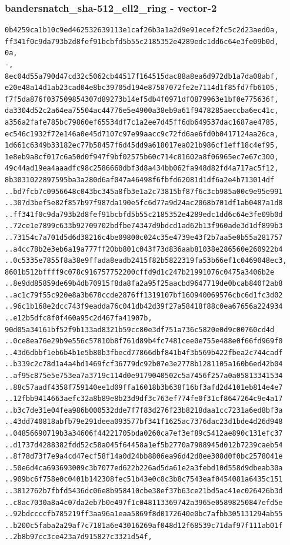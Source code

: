 \documentclass[
]{article}
\begin{document}
\subsubsection{bandersnatch\_sha-512\_ell2\_ring -
vector-2}\label{bandersnatch_sha-512_ell2_ring---vector-2}

\begin{verbatim}
0b4259ca1b10c9ed462532639113e1caf26b3a1a2d9e91ecef2fc5c2d23aed0a,
ff341f0c9da793b2d8fef91bcbfd5b55c2185352e4289edc1dd6c64e3fe09b0d,
0a,
-,
8ec04d55a790d47cd32c5062cb44517f164515dac88a8ea6d972db1a7da08abf,
e20e48a14d1ab23cad04e8bc39705d194e87587072fe2e7114d1f85fd7fb6105,
f7f5da876f037509854307d89273b14ef5db4f0971df0879963e1bf0e775636f,
da3304d52c2a64ea75504ac44776e5e4900a38eb9a61f9478285aeccba6ec41c,
a356a2fafe785bc79860ef65534df7c1a2ee7d45ff6db649537dac1687ae4785,
ec546c1932f72e146a0e45d7107c97e99aacc9c72fd6ae6fd0b0417124aa26ca,
1d661c6349b33182ec77b58457f6d45dd9a618017ea021b986cf1eff18c4ef95,
1e8eb9a8cf017c6a50d0f947f9bf02575b60c714c81602a8f06965ec7e67c300,
49c44ad19ea4aaadfc98c2586660dbf3d8a434bb062fa948d82fd4a717ac5f12,
8b3031022897595ba3a280d6af047a46498f6fbfd62081d1df6a2e4b713014df
..bd7fcb7c0956648c043bc345a8fb3e1a2c73815bf87f6c3cb985a00c9e95e991
..307d3bef5e82f857b97f987da190e5fc6d77a9d24ac2068b701df1ab0487a1d8
..ff341f0c9da793b2d8fef91bcbfd5b55c2185352e4289edc1dd6c64e3fe09b0d
..72ce1e7899c633b92709702bdfbe74347d9bdcd1ad62b13f960ade3d1df899b3
..73154c7a701d5d6d38216c4be09800c024c35e4739e43f2b7aa5e0b55a281757
..a4cc78b2e3eb6a19a777ff20bb801c043f73d836aab81038e286560e260922b4
..0c5335e7855f8a38e9ffada8eadb2415f82b5822319fa53b66ef1c0469048ec3,
8601b512bffff9c078c916757752200cffd9d1c247b21991076c0475a3406b2e
..8e9dd85859de69b4db70915f8da8fa2a95f25aacbd9647719de0bcab840f2ab8
..ac1c79f55c920e8a3b678ccde2876ff1319107bf160940069576cbc6d1fc3d02
..96c1b168e2dcc743f9eadda76c041db42d39f27a58418f88c0ea67656a224934
..e12b5dfc8f0f460a95c2d467fa41907b,
90d05a34161bf52f9b133ad8321b59cc80e3df751a736c5820e0d9c00760cd4d
..0ce8ea76e29b9e556c57810b8f761d89b4fc7481cee0e755e488e0f66fd969f0
..43d6dbbf1eb6b4b1e5b80b3fbecd77866dbf841b4f3b569b422fbea2c744cadf
..b339c2c78d1a4a4bd1469fcf36779dc92b07e3e2778b1281105a160b6ed42b04
..af95c875e5e753ea7a3719c114d0e9179040502c5a7456f257a0a05813341534
..88c57aadf4358f759140ee1d09ffa16018b3b638f16bf3afd2d4101eb814e4e7
..12fbb9414663aefc32a8b89e8b23d9df3c763ef774fe0f31cf8647264c9e4a17
..b3c7de31e04fea986b000532dde7f7f83d276f23b8218daa1cc7231a6ed8bf3a
..43dd740818abfb79e291deea093577bf341f1625ac7376dac23d1bde4d26d948
..04856690719b3a34606f44221705bda0260ca7ef3ef89c5412ae890c131efc37
..d1737d4288382fdd52c58a045f64458a1ef5b2770a7988945d012b7239caeb54
..8f78d73f7e9a4cd47ecf58f14a0d24bb8806ea96d42d8ee308d0f0bc2578041e
..50e6d4ca693693009c3b7077ed622b226ad5da61e2a3febd10d558d9dbeab30a
..909bc6f758e0c0401b142308fec51b43e0c8c3b8c7543eaf0454081a6435c151
..3812762b7fbfd5436dc06e8b958410cbe38ef37b63ce21bd5ac41ec026426b3d
..c8ac7030a8a4c07da2eb7b0e497f1c048113369742a3965e05898250847efd5e
..92bdccccfb785219ff3aa96a1eaa5869f8d0172640e0bc7afbb305131294ab55
..b200c5faba2a29af7c7181a6e43016269af048d12f68539c71daf97f111ab01f
..2b8b97cc3ce423a7d915827c3321d54f,
\end{verbatim}
\end{document}
